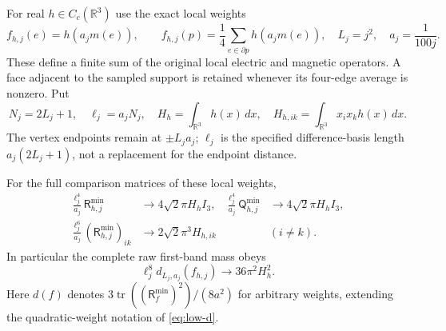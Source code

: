 For real $h\in C_c(\mathbb R^3)$ use the exact local weights
\[
 f_{h,j}(e)=h(a_jm(e)),\qquad
 f_{h,j}(p)=\frac14\sum_{e\in\partial p}h(a_jm(e)),
 \quad L_j=j^2,\quad a_j=\frac1{100j}.
\]
These define a finite sum of the original local electric and magnetic
operators. A face adjacent to the sampled support is retained whenever
its four-edge average is nonzero. Put
\[
 N_j=2L_j+1,\quad \ell_j=a_jN_j,\quad
 H_h=\int_{\mathbb R^3}h(x)\,dx,\quad
 H_{h,ik}=\int_{\mathbb R^3}x_ix_kh(x)\,dx.
\]
The vertex endpoints remain at $\pm L_ja_j$; $\ell_j$ is the
specified difference-basis length $a_j(2L_j+1)$, not a replacement
for the endpoint distance.

\begin{theorem}\label{thm:local-coefficients}
For the full comparison matrices of these local weights,
\begin{align}
 \frac{\ell_j^4}{a_j}\mathsf R_{h,j}^{\min}
 &\longrightarrow4\sqrt2\pi H_h I_3,
 &
 \frac{\ell_j^4}{a_j}\mathsf Q_{h,j}^{\min}
 &\longrightarrow4\sqrt2\pi H_h I_3, \label{eq:local-leading}\\
 \frac{\ell_j^6}{a_j}(\mathsf R_{h,j}^{\min})_{ik}
 &\longrightarrow2\sqrt2\pi^3 H_{h,ik}
 &&(i\ne k). \label{eq:local-quadrupole}
\end{align}
In particular the complete raw first-band mass obeys
\begin{equation}\label{eq:local-mass}
 \ell_j^8d_{L_j,a_j}(f_{h,j})\longrightarrow36\pi^2 H_h^2.
\end{equation}
Here $d(f)$ denotes $3\operatorname{tr}((\mathsf R_f^{\min})^2)/(8a^2)$
for arbitrary weights, extending the quadratic-weight notation of
\eqref{eq:low-d}.
\end{theorem}
